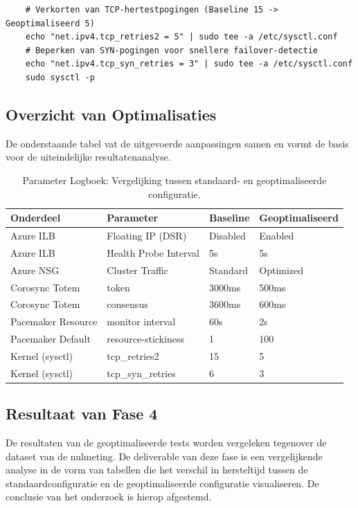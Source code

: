 \begin{verbatim}
    # Verkorten van TCP-hertestpogingen (Baseline 15 -> Geoptimaliseerd 5)
    echo "net.ipv4.tcp_retries2 = 5" | sudo tee -a /etc/sysctl.conf
    # Beperken van SYN-pogingen voor snellere failover-detectie
    echo "net.ipv4.tcp_syn_retries = 3" | sudo tee -a /etc/sysctl.conf
    sudo sysctl -p
\end{verbatim}

\subsection{Overzicht van Optimalisaties}
De onderstaande tabel vat de uitgevoerde aanpassingen samen en vormt de basis voor de uiteindelijke resultatenanalyse.

\begin{table}[H]
    \centering
    \small
    \begin{tabular}{|l|l|l|l|}
        \hline
        \textbf{Onderdeel} & \textbf{Parameter} & \textbf{Baseline} & \textbf{Geoptimaliseerd} \\ \hline
        Azure ILB & Floating IP (DSR) & Disabled & Enabled \\ \hline
        Azure ILB & Health Probe Interval & 5s & 5s \\ \hline 
        Azure NSG & Cluster Traffic & Standard & Optimized \\ \hline
        Corosync Totem & token & 3000ms & 500ms \\ \hline
        Corosync Totem & consensus & 3600ms & 600ms \\ \hline
        Pacemaker Resource & monitor interval & 60s & 2s \\ \hline
        Pacemaker Default & resource-stickiness & 1 & 100 \\ \hline
        Kernel (sysctl) & tcp\_retries2 & 15 & 5 \\ \hline
        Kernel (sysctl) & tcp\_syn\_retries & 6 & 3 \\ \hline
    \end{tabular}
    \caption{Parameter Logboek: Vergelijking tussen standaard- en geoptimaliseerde configuratie.}
    \label{tab:parameter-logboek}
\end{table}

\subsection{Resultaat van Fase 4}
De resultaten van de geoptimaliseerde tests worden vergeleken tegenover de dataset van de nulmeting. De deliverable van deze fase is een vergelijkende analyse in de vorm van tabellen die het verschil in hersteltijd tussen de standaardconfiguratie en de geoptimaliseerde configuratie visualiseren. De conclusie van het onderzoek is hierop afgestemd.


